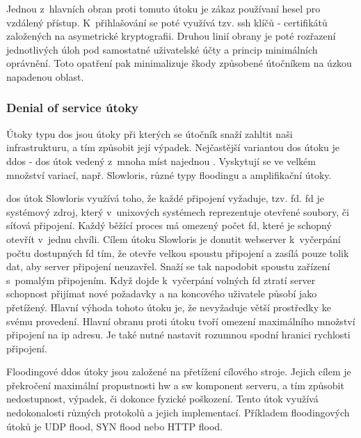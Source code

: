 Jednou z~hlavních obran proti tomuto útoku je zákaz používaní hesel pro vzdálený přístup. K~přihlašování se poté využívá tzv. \acrshort{ssh} klíčů\cite{ssh-keys} - certifikátů založených na asymetrické kryptografii. Druhou linií obrany je poté rozřazení jednotlivých úloh pod samostatné uživatelské účty a princip minimálních oprávnění. Toto opatření pak minimalizuje škody způsobené útočníkem na úzkou napadenou oblast. 

\subsubsection{Denial of service útoky}

Útoky typu \acrfull{dos}\cite{denial-of-service} jsou útoky při kterých se útočník snaží zahltit naši infrastrukturu, a tím způsobit její výpadek.
Nejčastější variantou \acrshort{dos} útoku je \acrfull{ddos} - \acrshort{dos} útok vedený z~mnoha míst najednou \cite{distributed-denial-of-service}. 
Vyskytují se ve velkém množství variací, např. Slowloris, různé typy floodingu a amplifikační útoky.


\noindent
\acrshort{dos} útok Slowloris\cite{slowloris} využívá toho, že každé připojení vyžaduje, tzv. \acrfull{fd}\cite{fd}. \acrshort{fd} je systémový zdroj, který v~unixových systémech reprezentuje otevřené soubory, či síťová připojení. Každý běžící proces má omezený počet \acrshort{fd}, které je schopný otevřít v~jednu chvíli. Cílem útoku Slowloris je donutit webserver k~vyčerpání počtu dostupných \acrshort{fd} tím, že otevře velkou spoustu připojení a zasílá pouze tolik dat, aby server připojení neuzavřel. Snaží se tak napodobit spoustu zařízení s~pomalým připojením. Když dojde k~vyčerpání volných \acrshort{fd} ztratí server schopnost přijímat nové požadavky a na koncového uživatele působí jako přetížený. Hlavní výhoda tohoto útoku je, že nevyžaduje větší prostředky ke svému provedení. Hlavní obranu proti útoku tvoří omezení maximálního množství připojení na \acrshort{ip} adresu. Je také nutné nastavit rozumnou spodní hranici rychlosti připojení.

\label{subsec:ddos-flood-attack}

\noindent
Floodingové \acrshort{ddos} útoky jsou založené na přetížení cílového stroje. Jejich cílem je překročení maximální propustnosti \acrshort{hw} a \acrshort{sw} komponent serveru, a tím způsobit nedostupnost, výpadek, či dokonce fyzické poškození. Tento útok využívá nedokonalosti různých protokolů a jejich implementací. Příkladem floodingových útoků je UDP flood\cite{udp-flood}, SYN flood\cite{syn-flood} nebo HTTP flood\cite{http-flood}.

